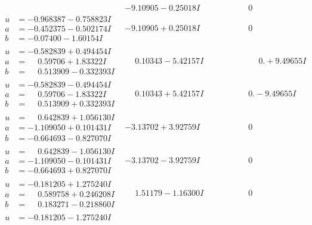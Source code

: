 \documentclass[1p]{elsarticle_modified}
\theoremstyle{definition}
\begin{document}
$$\begin{array}{c|c|c}
 & -9.10905 - 0.25018 I & \phantom{-0.000000 } 0 \\ \hline\begin{aligned}
u &= -0.968387 - 0.758823 I \\
a &= -0.452375 - 0.502174 I \\
b &= -0.07400 - 1.60154 I\end{aligned}
 & -9.10905 + 0.25018 I & \phantom{-0.000000 } 0 \\ \hline\begin{aligned}
u &= -0.582839 + 0.494454 I \\
a &= \phantom{-}0.59706 + 1.83322 I \\
b &= \phantom{-}0.513909 - 0.332393 I\end{aligned}
 & \phantom{-}0.10343 - 5.42157 I & \phantom{-0.000000 -}0. + 9.49655 I \\ \hline\begin{aligned}
u &= -0.582839 - 0.494454 I \\
a &= \phantom{-}0.59706 - 1.83322 I \\
b &= \phantom{-}0.513909 + 0.332393 I\end{aligned}
 & \phantom{-}0.10343 + 5.42157 I & \phantom{-0.000000 } 0. - 9.49655 I \\ \hline\begin{aligned}
u &= \phantom{-}0.642839 + 1.056130 I \\
a &= -1.109050 + 0.101431 I \\
b &= -0.664693 - 0.827070 I\end{aligned}
 & -3.13702 + 3.92759 I & \phantom{-0.000000 } 0 \\ \hline\begin{aligned}
u &= \phantom{-}0.642839 - 1.056130 I \\
a &= -1.109050 - 0.101431 I \\
b &= -0.664693 + 0.827070 I\end{aligned}
 & -3.13702 - 3.92759 I & \phantom{-0.000000 } 0 \\ \hline\begin{aligned}
u &= -0.181205 + 1.275240 I \\
a &= \phantom{-}0.589758 + 0.246208 I \\
b &= \phantom{-}0.183271 - 0.218860 I\end{aligned}
 & \phantom{-}1.51179 - 1.16300 I & \phantom{-0.000000 } 0 \\ \hline\begin{aligned}
u &= -0.181205 - 1.275240 I \\

\end{aligned}
\end{array}$$
\end{document}
